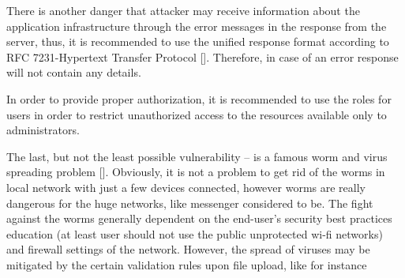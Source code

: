 There is another danger that attacker may receive information about the application infrastructure
through the error messages in the response from the server, thus, it is recommended to use the unified
response format according to RFC 7231-Hypertext Transfer Protocol [\cite{fielding2014rfc}].
Therefore, in case of an error response will not contain any details.

In order to provide proper authorization, it is recommended to use the roles for users in order to restrict
unauthorized access to the resources available only to administrators.

The last, but not the least possible vulnerability -- is a famous worm and virus spreading problem [\cite{mannan2005instant}].
Obviously, it is not a problem to get rid of the worms in local network with just a few devices connected,
however worms are really dangerous for the huge networks, like messenger considered to be.
The fight against the worms generally dependent on the end-user's security best practices education (at least user should
not use the public unprotected wi-fi networks) and firewall settings of the network.
However, the spread of viruses may be mitigated by the certain validation rules upon file upload, like for instance
